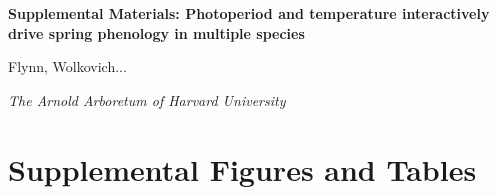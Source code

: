 \documentclass{article}
\begin{document}

\flushleft

\textbf{\large{Supplemental Materials: Photoperiod and temperature interactively drive spring phenology in multiple species}}

Flynn, Wolkovich...

\textit{The Arnold Arboretum of Harvard University}

\renewcommand{\thetable}{S\arabic{table}}
\renewcommand{\thefigure}{S\arabic{figure}}

\section*{Supplemental Figures and Tables}
\end{document}
